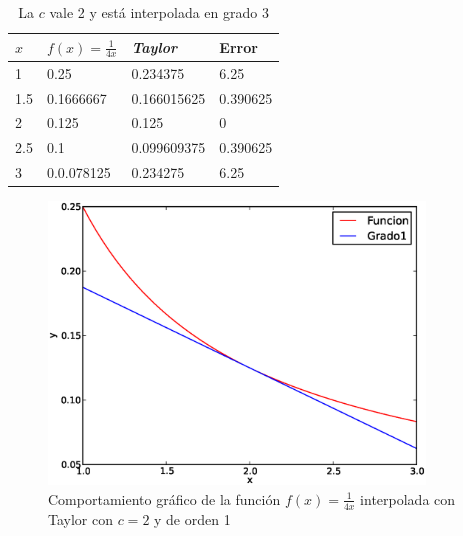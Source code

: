 \documentclass{beamer}
\newtheorem{descripcion de los experimentos}{\underline {Descripcion de los experimentos}}
\begin{document}
\begin{frame}
\begin{table}[!hbt]\label{transparencia tabla 3}
\begin{center}
\begin{tabular}[c]{||l | l ||l|l||}
\hline
\hline
$x$ & $f(x)=\frac{1}{4x}$ &{\em Taylor} & Error \\
\hline
1 &0.25& 0.234375 & 6.25 \\
\hline
1.5 &0.1666667&0.166015625& 0.390625\\
\hline
2 &0.125 &0.125 & 0 \\
\hline
2.5 &0.1 &0.099609375 & 0.390625 \\
\hline
3 & 0.0.078125 & 0.234275& 6.25 \\
\hline
\hline
\end{tabular}
\caption{La $c$ vale 2 y está interpolada en grado 3}
\end{center}
\end{table}
\hfill \hyperlink{transparencia grafica3}{}
\end{frame}


\begin{frame}
\hfill \hyperlink{transparencia tabla 1}{}
\begin{figure}\label{transparencia grafica1}
  \caption{Comportamiento gráfico de la función $f(x)=\frac{1}{4x}$ interpolada con Taylor con $c=2$ y de orden 1}
\includegraphics[width=10cm]{img/segunda.eps}
\end{figure}
\end{frame}
\end{document}
